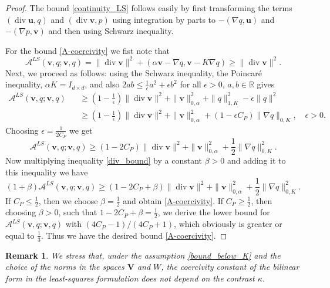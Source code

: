 \documentclass[11pt]{amsart}
\numberwithin{equation}{section}
\newtheorem{remark}{Remark}[section]
\theoremstyle{definition}\newtheorem{example}{Example}[section]
\begin{document}
\begin{proof}
The bound \eqref{continuity_LS} follows easily by first transforming the terms
$({\operatorname{div}} {{\mathbf u}}, q) $ and $ ({\operatorname{div}} {{\mathbf v}}, p)$ using integration by parts to
$-(\nabla q, {{\mathbf u}}) $ and $ -(\nabla p,  {{\mathbf v}})$ and then using Schwarz inequality.

For the bound \eqref{A-coercivity} we fist note that 
\begin{equation}\label{div_bound}
{{\mathcal A}}^{LS}({{\mathbf v}},q; {{\mathbf v}},q)  = \|{\operatorname{div}} {{\mathbf v}} \|^2 + (\alpha {{\mathbf v}} - \nabla q, {{\mathbf v}} - K \nabla q) 
\ge \|{\operatorname{div}} {{\mathbf v}} \|^2.
\end{equation}
Next, we proceed as follows: using the Schwarz inequality, the
Poincar\'e inequality, $\alpha K = I_{d\times d}$, and
also $2ab\le \frac{1}{\epsilon}a^2+{\epsilon}b^2$ for all
$\epsilon > 0$, $a,b\in \mathbb{R}$ gives
\begin{eqnarray*}
{{\mathcal A}}^{LS}({{\mathbf v}},q; {{\mathbf v}},q)   &&  \ge  (1-\frac{1}{\epsilon})\|{\operatorname{div}} {{\mathbf v}}\|^2  +  
\|{{\mathbf v}}\|_{0,\alpha}^2 + \|q\|^2_{1,K} - \epsilon \|q \|^2 \\
 &&   \ge (1-\frac{1}{\epsilon})\|{\operatorname{div}} {{\mathbf v}} \|^2 
+ \|{{\mathbf v}}\|^2_{0,\alpha} + (1 - \epsilon C_P)\|\nabla q\|_{0,K}, \quad \epsilon >0.
\end{eqnarray*}
Choosing $\epsilon = \frac{1}{2 C_P}$ 
we get
$$
{{\mathcal A}}^{LS}({{\mathbf v}},q; {{\mathbf v}},q) \ge (1-2 C_P)\|{\operatorname{div}} {{\mathbf v}} \|^2 
+ \|{{\mathbf v}}\|_{0,\alpha}^2 + \frac12 \|\nabla q\|_{0,K}^2.
$$
Now multiplying inequality \eqref{div_bound} by a 
constant $\beta >0$ and adding it to this inequality we have
$$
(1+ \beta) {{\mathcal A}}^{LS}({{\mathbf v}},q; {{\mathbf v}},q) \ge ( 1-2 C_P + \beta) \|{\operatorname{div}} {{\mathbf v}} \|^2 
+ \|{{\mathbf v}}\|^2_{0,\alpha} + \frac12 \|\nabla q\|_{0,K}^2.
$$
If $C_P\le \frac12$, then we choose $\beta=\frac12$ and obtain \eqref{A-coercivity}.
If $C_P \ge \frac12$, then
choosing $\beta > 0 $, such that $  1-2 C_P + \beta= \frac12$, we derive
the lower bound for 
${{\mathcal A}}^{LS}({{\mathbf v}},q; {{\mathbf v}},q)$ with $ (4 C_P -1)/(4C_P+ 1)$, which obviously is greater or equal to
$\frac13$. Thus we have  the desired bound \eqref{A-coercivity}.
\end{proof}
\begin{remark}
We stress that, under the assumption \eqref{bound_below_K} 
and the choice of the norms in the spaces ${{\boldsymbol V}}$ and $W$,  
 the coercivity constant of the bilinear form in the least-squares formulation
does not depend on the contrast $\kappa$.
\end{remark}
\end{document}
